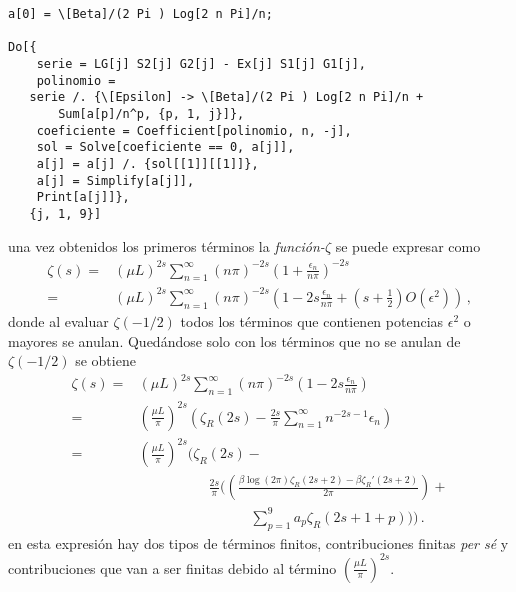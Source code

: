 \begin{verbatim}
a[0] = \[Beta]/(2 Pi ) Log[2 n Pi]/n;

Do[{
  	serie = LG[j] S2[j] G2[j] - Ex[j] S1[j] G1[j],
  	polinomio = 
   serie /. {\[Epsilon] -> \[Beta]/(2 Pi ) Log[2 n Pi]/n + 
       Sum[a[p]/n^p, {p, 1, j}]},
  	coeficiente = Coefficient[polinomio, n, -j],
  	sol = Solve[coeficiente == 0, a[j]],
  	a[j] = a[j] /. {sol[[1]][[1]]},
  	a[j] = Simplify[a[j]],
  	Print[a[j]]},
   {j, 1, 9}]
\end{verbatim}
una vez obtenidos los primeros términos la {\it función-$\zeta$} se puede expresar como
\begin{equation}
\begin{aligned}
\zeta (s) =& 
( \mu L ) ^{2s}
\sum _{n=1} ^{\infty}
( n \pi) ^{-2s} \left( 1 + \frac{ \epsilon _n }{n \pi } \right) ^{-2s } \\
 =& 
(\mu L) ^{2s} \sum _{n=1} ^{\infty}
( n \pi) ^{-2s} \left(
						1 -2s  \frac{\epsilon _n}{n \pi} + 
						\left( s + \frac{1}{2} \right) O( \epsilon ^2 )
						\right)
\, ,
\end{aligned}
\end{equation}
donde al evaluar $\zeta (-1/2)$ todos los términos que contienen potencias $\epsilon ^2$ o mayores se anulan. Quedándose solo con los términos que no se anulan de $\zeta (-1/2)$ se obtiene
\begin{equation}
\begin{aligned}
\zeta (s) =& (\mu L) ^{2s} \sum _{n=1} ^{\infty} 
	(n \pi ) ^{-2s}
		\left(
				1 - 2s \frac{\epsilon _n}{n \pi } 
				\right) \\
		=& \left( \frac{\mu L}{\pi} \right) ^{2s}
				\left(
						\zeta _R (2s) - 
						\frac{2 s}{\pi } \sum _{n=1} ^{\infty} 
						n ^{-2s-1} \epsilon _n
						\right)
\\
		=& \left( \frac{\mu L }{\pi} \right) ^{2s}
			\Bigg(
						\zeta _R (2s) - \\ 
						& \qquad \qquad \quad
						\frac{2 s}{\pi }  \Bigg( \left(
							\frac{\beta \log (2 \pi) \zeta _R (2s+2) -
							\beta \zeta _R ' (2s+2)}{2 \pi }
								\right) + \\
								& \qquad \qquad \qquad \qquad 
								\sum _{p=1} ^{9} 
							a _p \zeta _R (2s+1+p)
								\Bigg) \Bigg) \, .
\end{aligned}
\end{equation}
en esta expresión hay dos tipos de términos finitos, contribuciones finitas {\it per sé} y contribuciones que van a ser finitas debido al término $ \left( \frac{\mu L}{\pi}\right) ^{2s}$.

